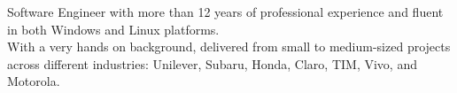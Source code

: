 \par{
Software Engineer with more than 12 years of professional experience and fluent in both Windows and Linux platforms.\\
With a very hands on background, delivered from small to medium-sized projects across different industries: Unilever, Subaru, Honda, Claro, TIM, Vivo, and Motorola.
}